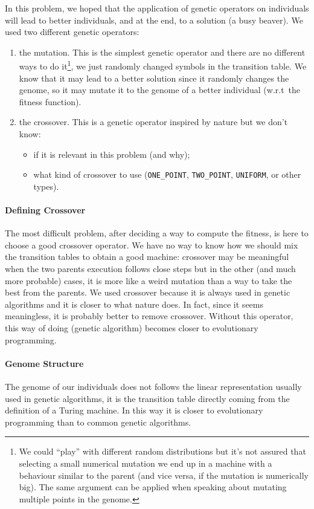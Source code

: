 \documentclass{report}
\begin{document}
In this problem, we hoped that the application of genetic operators on individuals will lead to better individuals, and at the end, to a solution (a busy beaver).
We used two different genetic operators:
\begin{enumerate}
\item the mutation. This is the simplest genetic operator and there are no different ways to do it\footnote{We could ``play'' with different random distributions but it's not assured that selecting a small numerical mutation we end up in a machine with a behaviour similar to the parent (and vice versa, if the mutation is numerically big). The same argument can be applied when speaking about mutating multiple points in the genome.}, we just randomly changed symbols in the transition table. We know that it may lead to a better solution since it randomly changes the genome, so it may mutate it to the genome of a better individual (w.r.t\ the fitness function).
\item the crossover. This is a genetic operator inspired by nature but we don't know:
  \begin{itemize}
  \item if it is relevant in this problem (and why);
  \item what kind of crossover to use (\texttt{ONE\_POINT}, \texttt{TWO\_POINT}, \texttt{UNIFORM}, or other types).
  \end{itemize}
\end{enumerate}

\paragraph{Defining Crossover}
The most difficult problem, after deciding a way to compute the fitness, is here to choose a good crossover operator. We have no way to know how we should mix the transition tables to obtain a good machine: crossover may be meaningful when the two parents execution follows close steps but in the other (and much more probable) cases, it is more like a weird mutation than a way to take the best from the parents.
We used crossover because it is always used in genetic algorithms and it is closer to what nature does. In fact, since it seems meaningless, it is probably better to remove crossover. 
Without this operator, this way of doing (genetic algorithm) becomes closer to evolutionary programming.

\paragraph{Genome Structure}
The genome of our individuals does not follows the linear representation usually used in genetic algorithms, it is the transition table directly coming from the definition of a Turing machine. In this way it is closer to evolutionary programming than to common genetic algorithms.
\end{document}
